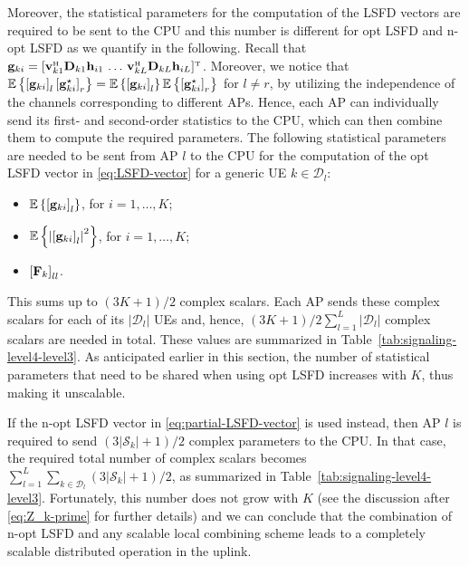 Moreover, the statistical parameters for the computation of the LSFD vectors are required to be sent to the CPU and this number is different for opt LSFD and n-opt LSFD as we quantify in the following. Recall that  $\vect{g}_{ki} = [ \vect{v}_{k1}^{\Htran}\vect{D}_{k1} \vect{h}_{i1} \, \ldots \, \vect{v}_{kL}^{\Htran} \vect{D}_{kL} \vect{h}_{iL}]^{\Ttran}$. Moreover, we notice that $\mathbb{E}\left\{ \left[ \mathbf{g}_{ki} \right]_l \left[ \mathbf{g}_{ki}^{\star} \right]_r  \right\}=\mathbb{E}\left\{ \left[ \mathbf{g}_{ki} \right]_l\right\}\mathbb{E}\left\{ \left[ \mathbf{g}_{ki}^{\star} \right]_r\right\}$ for $ l\neq r$, by utilizing the independence of the channels corresponding to different APs. Hence, each AP can individually send its first- and second-order statistics to the CPU, which can then combine them to compute the required parameters.
The following statistical parameters are needed to be sent from AP $l$ to the CPU for the computation of the opt LSFD vector in \eqref{eq:LSFD-vector} for a generic UE $k\in\mathcal{D}_l$:
\begin{itemize}
	\item  $\mathbb{E}\left\{  \left[ \mathbf{g}_{ki} \right]_l\right\} $, for $i=1,\ldots,K$;
	\item $\mathbb{E}\left\{  \left | \left[ \mathbf{g}_{ki} \right]_l \right |^2\right\} $, for $i=1,\ldots,K$;
	\item $\left [ \mathbf{F}_k \right ]_{ll}$.
\end{itemize}
This sums up to $\left(3K+1\right)/2$ complex scalars. Each AP sends these complex scalars for each of its $|\mathcal{D}_l|$ UEs and, hence, $\left(3K+1\right)/2\sum_{l=1}^{L} |\mathcal{D}_l|$ complex scalars are needed in total. These values are summarized in Table~\ref{tab:signaling-level4-level3}. As anticipated earlier in this section, the number of statistical parameters that need to be shared when using opt LSFD increases with $K$, thus making it unscalable. 

If the n-opt LSFD vector in \eqref{eq:partial-LSFD-vector} is used instead, then AP $l$ is required to send $\left(3|\mathcal{S}_k|+1\right)/2$ complex parameters to the CPU. In that case, the required total number of complex scalars becomes $\sum_{l=1}^{L} \sum_{k \in \mathcal{D}_l} \left(3|\mathcal{S}_k|+1\right)/2$, as summarized in Table~\ref{tab:signaling-level4-level3}. Fortunately, this number does not grow with $K$ (see the discussion after \eqref{eq:Z_k-prime} for further details) and we can conclude that the combination of n-opt LSFD and any scalable local combining scheme leads to a completely scalable distributed operation in the uplink. 

